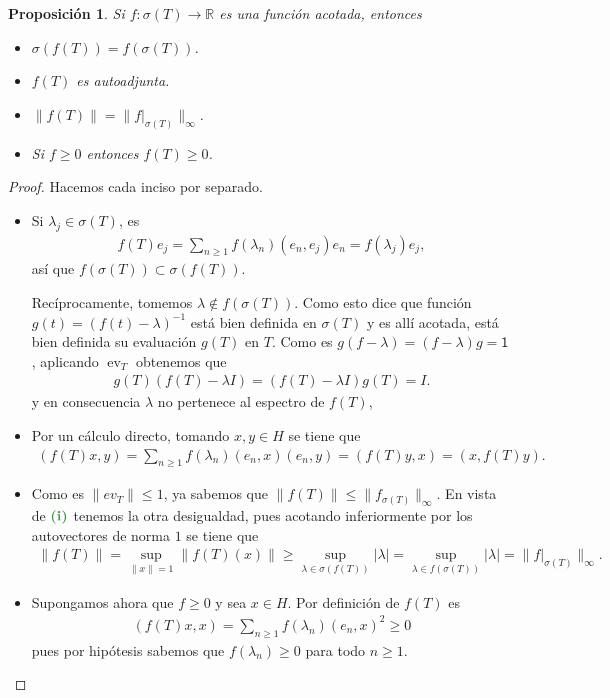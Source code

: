 \documentclass[11pt]{report}
\theoremstyle{colored}
\newtheorem{proposition}{Proposición}[section]
\newcommand{\R}{\mathbb{R}}
\newcommand{\ev}{\operatorname{ev}}
\newcommand{\ip}[1]{( #1 )}
\newcommand{\paint}[1]{\color{color}{#1}}
\newcommand{\tpaint}[1]{\paint{\textbf{#1}}}
\begin{document}
\begin{proposition} Si $f : \sigma(T) \to \R$ es una función acotada, entonces
\begin{itemize}
\item[(i)] $\sigma(f(T)) = f(\sigma(T))$.
\item[(ii)] $f(T)$ es autoadjunta.
\item[(iii)] $\|f(T)\| = \|f|_{\sigma(T)}\|_{\infty}$.
\item[(iv)] Si $f \geq 0$ entonces $f(T) \geq 0$.
\end{itemize}
\end{proposition}
\begin{proof} Hacemos cada inciso por separado. 
\begin{itemize}[listparindent = \parindent]
\item[(i)] Si $\lambda_j \in \sigma(T)$, es
\begin{align*}
f(T)e_j = \sum_{n \geq 1}f(\lambda_n)(e_n,e_j)e_n = f(\lambda_j)e_j,
\end{align*}
así que $f(\sigma(T)) \subset \sigma(f(T))$. 

Recíprocamente, tomemos $\lambda \not \in f(\sigma(T))$. Como esto dice que función $g(t) = (f(t)-\lambda)^{-1}$ está bien definida en $\sigma(T)$ y es allí acotada, está bien definida su evaluación $g(T)$ en $T$. Como es $g(f-\lambda) = (f-\lambda)g = \mathsf{1}$, aplicando $\ev_T$ obtenemos que
\begin{align*}
g(T)(f(T)- \lambda I) = (f(T) - \lambda I)g(T) = I.
\end{align*}
y en consecuencia $\lambda$ no pertenece al espectro de $f(T)$,
\item[(ii)] Por un cálculo directo, tomando $x,y \in H$ se tiene que 
\begin{align*}
\ip{f(T)x, y} = \sum_{n \geq 1} f(\lambda_n) \ip{e_n, x}\ip{e_n,y}  = \ip{f(T)y,x} = \ip{x, f(T)y}.
\end{align*}
\item[(iii)] Como es $\|ev_T\| \leq 1$, ya sabemos que $\|f(T)\| \leq \|f_{\sigma(T)}\|_\infty$. En vista de $\tpaint{(i)}$ tenemos la otra desigualdad, pues acotando inferiormente por los autovectores de norma $1$ se tiene que 
\begin{align*}
\|f(T)\| = \sup_{\|x\| = 1}\|f(T)(x)\| \geq \sup_{\lambda \in \sigma(f(T))}|\lambda| = \sup_{\lambda \in f(\sigma(T))}|\lambda| = \|f|_{\sigma(T)}\|_\infty.
\end{align*}
\item[(iv)] Supongamos ahora que $f \geq 0$ y sea $x \in H$. Por definición de $f(T)$ es 
\begin{align*}
(f(T)x,x) = \sum_{n \geq 1} f(\lambda_n) \ip{e_n, x}^2 \geq 0
\end{align*}
pues por hipótesis sabemos que $f(\lambda_n) \geq 0$ para todo $n \geq 1$.
\end{itemize}
\end{proof}
\end{document}
